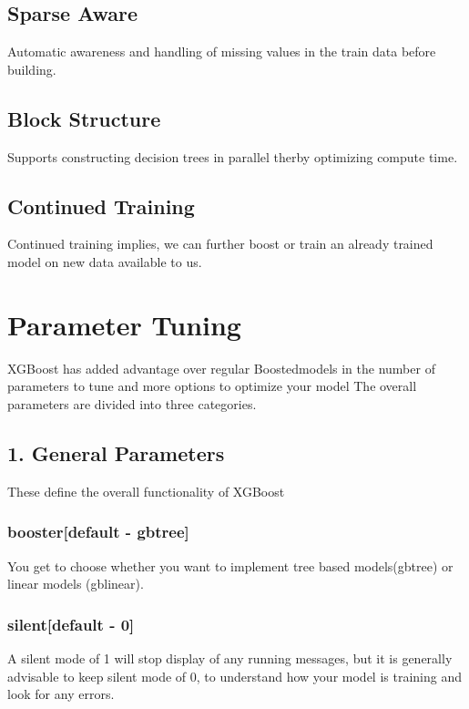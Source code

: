 \subsection{Sparse Aware} 

Automatic awareness and handling of missing values in the train data before 
building.

\subsection{Block Structure}

Supports constructing decision trees in parallel therby optimizing compute time.

\subsection{Continued Training} 

Continued training implies, we can further boost or train an already trained
model on new data available to us.



\section{Parameter Tuning} 

XGBoost has added advantage over regular Boostedmodels in the number of
parameters  to tune and more options to optimize your model The overall
parameters are divided  into three categories.

\subsection{1. General Parameters}

These define the overall functionality of XGBoost

\subsubsection{booster[default - gbtree]}  

You get to choose whether you want to implement tree based models(gbtree) or
linear  models (gblinear).

\subsubsection{silent[default - 0]}

A silent mode of 1 will stop display of any running messages, but it is
generally  advisable to keep silent mode of 0, to understand how your model is
training and  look for any errors.

